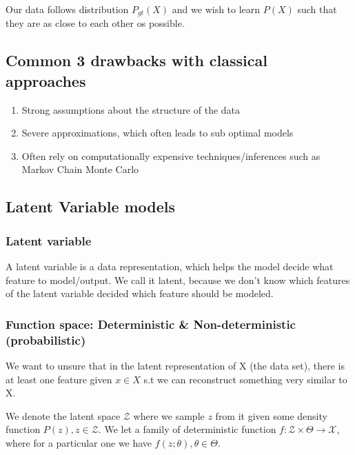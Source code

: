 \documentclass[12pt,a4paper]{report}
\begin{document}
Our data follows distribution \(P_{gt}(X)\) and we wish to learn \(P(X)\) such that they are as close to each other os possible.
\\ \vspace{0.3cm}

\subsection{Common 3 drawbacks with classical approaches}

\begin{enumerate}
\item Strong assumptions about the structure of the data
\item Severe approximations, which often leads to sub optimal models
\item Often rely on computationally expensive techniques/inferences such as Markov Chain Monte Carlo
\end{enumerate}

\subsection{Latent Variable models}

\subsubsection{Latent variable}

A latent variable is a data representation, which helps the model decide what feature to model/output.
We call it latent, because we don't know which features of the latent variable decided which feature should be modeled.


\subsubsection{Function space: Deterministic \& Non-deterministic (probabilistic)}

We want to unsure that in the latent representation of X (the data set), there is at least one feature given \(x \in X\) s.t we can reconstruct something very similar to X. 
\\ \vspace{0.3cm}

We denote the latent space \(\mathcal{Z}\) where we sample \(z\) from it given some density function \(P(z), z \in \mathcal{Z}\).
We let a family of deterministic function \(f: \mathcal{Z} \times \Theta \rightarrow \mathcal{X} \), where for a particular one we have \(f(z;\theta), \theta \in \Theta\). 
\\ \vspace{0.3cm}
\end{document}
